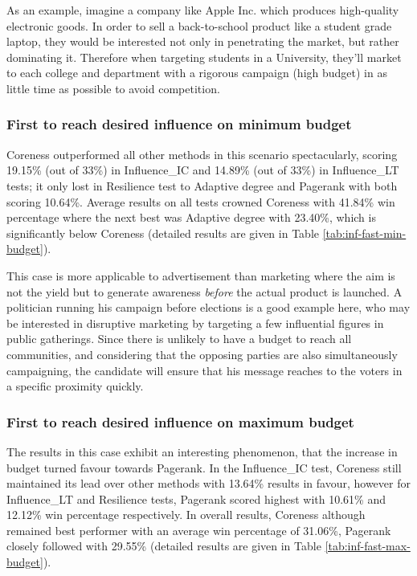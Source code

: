 		As an example, imagine a company like Apple Inc. which produces high-quality electronic goods. In order to sell a back-to-school product like a student grade laptop, they would be interested not only in penetrating the market, but rather dominating it. Therefore when targeting students in a University, they'll market to each college and department with a rigorous campaign (high budget) in as little time as possible to avoid competition.
	
		\subsubsection{First to reach desired influence on minimum budget}
		Coreness outperformed all other methods in this scenario spectacularly, scoring 19.15\% (out of 33\%) in Influence\_IC and 14.89\% (out of 33\%) in Influence\_LT tests; it only lost in Resilience test to Adaptive degree and Pagerank with both scoring 10.64\%. Average results on all tests crowned Coreness with 41.84\% win percentage where the next best was Adaptive degree with 23.40\%, which is significantly below Coreness (detailed results are given in Table \ref{tab:inf-fast-min-budget}).
		
		This case is more applicable to advertisement than marketing where the aim is not the yield but to generate awareness \textit{before} the actual product is launched. A politician running his campaign before elections is a good example here, who may be interested in disruptive marketing by targeting a few influential figures in public gatherings. Since there is unlikely to have a budget to reach all communities, and considering that the opposing parties are also simultaneously campaigning, the candidate will ensure that his message reaches to the voters in a specific proximity quickly.	
	
		\subsubsection{First to reach desired influence on maximum budget}
		The results in this case exhibit an interesting phenomenon, that the increase in budget turned favour towards Pagerank. In the Influence\_IC test, Coreness still maintained its lead over other methods with 13.64\% results in favour, however for Influence\_LT and Resilience tests, Pagerank scored highest with 10.61\% and 12.12\% win percentage respectively. In overall results, Coreness although remained best performer with an average win percentage of 31.06\%, Pagerank closely followed with 29.55\% (detailed results are given in Table \ref{tab:inf-fast-max-budget}).
	
